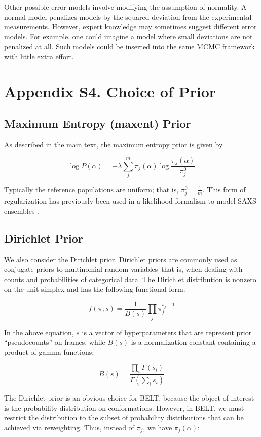 \documentclass[12pt]{article}
\begin{document}
Other possible error models involve modifying the assumption of normality.  A normal model penalizes models by the squared deviation from the experimental measurements.  However, expert knowledge may sometimes suggest different error models.  For example, one could imagine a model where small deviations are not penalized at all.  Such models could be inserted into the same MCMC framework with little extra effort.

\newpage

\section*{Appendix S4.  Choice of Prior}

\subsection*{Maximum Entropy (maxent) Prior}

As described in the main text, the maximum entropy prior is given by 

$$\log P(\alpha) = -\lambda \sum_j^m \pi_j(\alpha) \log \frac{\pi_j(\alpha)}{\pi_j^0}$$

Typically the reference populations are uniform; that is, $\pi_j^0 = \frac{1}{m}$.  This form of regularization has previously been used in a likelihood formalism to model SAXS ensembles \cite{rozycki2011saxs}.  

\subsection*{Dirichlet Prior}

We also consider the Dirichlet prior.  Dirichlet priors are commonly used as conjugate priors to multinomial random variables--that is, when dealing with counts and probabilities of categorical data.  The Dirichlet distribution is nonzero on the unit simplex and has the following functional form:

$$f(\pi;s) = \frac{1}{B(s)} \prod_j \pi_j^{s_j - 1}$$

In the above equation, $s$ is a vector of hyperparameters that are represent prior ``pseudocounts'' on frames, while $B(s)$ is a normalization constant containing a product of gamma functions:

$$B(s) = \frac{\prod_i \Gamma(s_i)}{\Gamma(\sum_i s_i)}$$

The Dirichlet prior is an obvious choice for BELT, because the object of interest is the probability distribution on conformations.  However, in BELT, we must restrict the distribution to the subset of probability distributions that can be achieved via reweighting.  Thus, instead of $\pi_j$, we have $\pi_j(\alpha)$:
\end{document}
